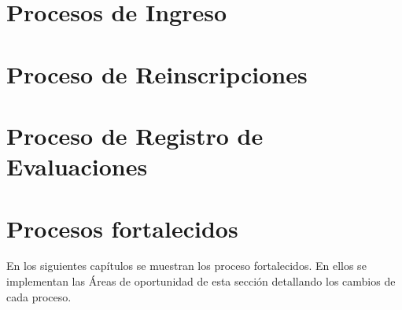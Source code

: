 \section{Procesos de Ingreso}


\section{Proceso de Reinscripciones}

\section{Proceso de Registro de Evaluaciones}

\section{Procesos fortalecidos}

	En los siguientes capítulos se muestran los proceso fortalecidos. En ellos se implementan las Áreas de oportunidad de esta sección detallando los cambios de cada proceso.

%

